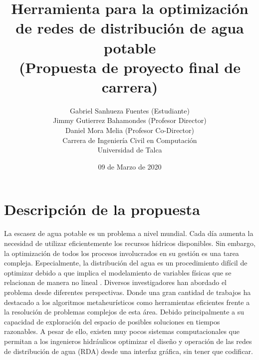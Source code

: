 \documentclass[11pt,letterpaper]{article}
\begin{document}
\pagestyle{empty}

\title{
Herramienta para la optimización de redes de distribución de agua potable\\
(Propuesta de proyecto final de carrera)
}
\author{
Gabriel Sanhueza Fuentes (Estudiante)\\
Jimmy Gutierrez Bahamondes (Profesor Director)\\
Daniel Mora Melia (Profesor Co-Director)\\
Carrera de Ingeniería Civil en Computación\\ 
Universidad de Talca}
\date{09 de Marzo de 2020}

\maketitle


\section{Descripción de la propuesta}


La escasez de agua potable es un problema a nivel mundial. Cada día aumenta la necesidad de utilizar eficientemente los recursos hídricos disponibles. Sin embargo, la optimización de todos los procesos involucrados en su gestión es una tarea compleja. Especialmente, la distribución del agua es un procedimiento difícil de optimizar debido a que implica el modelamiento de variables físicas que se relacionan de manera no lineal \cite{Basha1996}. Diversos investigadores han abordado el problema desde diferentes perspectivas. Donde una gran cantidad de trabajos ha destacado a los algoritmos metaheurísticos como herramientas eficientes frente a la resolución de problemas complejos de esta área. Debido principalmente a su capacidad de exploración del espacio de posibles soluciones en tiempos razonables. A pesar de ello, existen muy pocos sistemas computacionales que permitan a los ingenieros hidráulicos optimizar el diseño y operación de las redes de distribución de agua (RDA) desde una interfaz gráfica, sin tener que codificar.  
\end{document}
